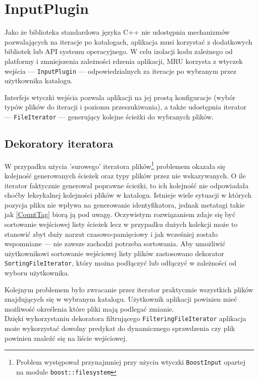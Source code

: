 \section{InputPlugin}
\par
Jako że biblioteka standardowa języka C++ nie udostępnia mechanizmów pozwalających na iteracje po katalogach, aplikacja musi korzystać z dodatkowych bibliotek lub API systemu operacyjnego. W celu izolacji kodu zależnego od platformy i zmniejszenia zależności rdzenia aplikacji, MRU korzysta z wtyczek wejścia --- \texttt{InputPlugin} --- odpowiedzialnych za iteracje po wybranym przez użytkownika katalogu.
\par
Interfejs wtyczki wejścia pozwala aplikacji na jej prostą konfiguracje (wybór typów plików do iteracji i poziomu przeszukiwania), a także udostępnia iterator --- \texttt{FileIterator} --- generujący kolejne ścieżki do wybranych plików.
\subsection{Dekoratory iteratora}
\par
W przypadku użycia 'surowego' iteratora plików\footnote{Problem występował przynajmniej przy użyciu wtyczki \texttt{BoostInput} opartej na module \texttt{boost::filesystem}} problemem okazała się kolejność generowanych ścieżek oraz typy plików przez nie wskazywanych.
O ile iterator faktycznie generował poprawne ścieżki, to ich kolejność nie odpowiadała choćby leksykalnej kolejności plików w katalogu. Istnieje wiele sytuacji w których pozycja pliku nie wpływa na generowanie identyfikatora, jednak metatagi takie jak \ref{CountTag} biorą ją pod uwagę. Oczywistym rozwiązaniem zdaje się być sortowanie wejściowej listy ścieżek lecz w przypadku dużych kolekcji może to stanowić zbyt duży narzut czasowo-pamięciowy i jak wcześniej zostało wspomniane --- nie zawsze zachodzi potrzeba sortowania. Aby umożliwić użytkownikowi sortowanie wejściowej listy plików zastosowano dekorator \texttt{SortingFileIterator}, który można podłączyć lub odłączyć w zależności od wyboru użytkownika.

\par
Kolejnym problemem było zwracanie przez iterator praktycznie wszystkich plików znajdujących się w wybranym katalogu. Użytkownik aplikacji powinien mieć możliwość określenia które pliki mają podlegać zmianie.\\
Dzięki wykorzystaniu dekoratora filtrującego \texttt{FilteringFileIterator} aplikacja może wykorzystać dowolny predykat do dynamicznego sprawdzenia czy plik powinien znaleźć się na liście wejściowej.

